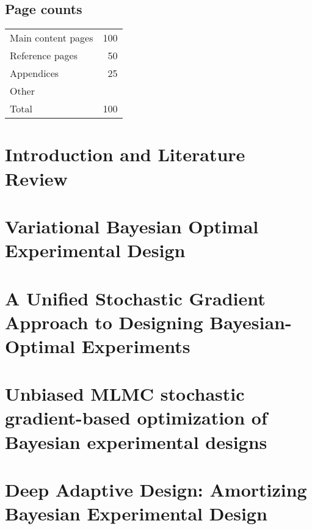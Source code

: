 \documentclass[a4paper, 10pt]{report}
\theoremstyle{plain}
\theoremstyle{definition}
\theoremstyle{remark}
\begin{document}
	
	\tableofcontents
	
	\section*{Page counts}
	\begin{center}
		\begin{tabular}{lr}
			Main content pages & 100 \\
			Reference pages & 50 \\
			Appendices & 25 \\
			Other & \\
			\hline
			Total & 100
		\end{tabular}
	\end{center}
	
\newpage
	
	
	\chapter{Introduction and Literature Review}
	\label{chap:intro}
	
	
	\chapter{Variational Bayesian Optimal Experimental Design}
	\label{chap:vboed}
	
	
	
	\chapter{A Unified Stochastic Gradient Approach to Designing Bayesian-Optimal Experiments}
	\label{chap:sgboed}
	
	
	\chapter{Unbiased MLMC stochastic gradient-based optimization of Bayesian experimental designs}
	\label{chap:mlmc}
	
	
	\chapter{Deep Adaptive Design: Amortizing Bayesian Experimental Design}
	\label{chap:dad}
	
	
\end{document}
